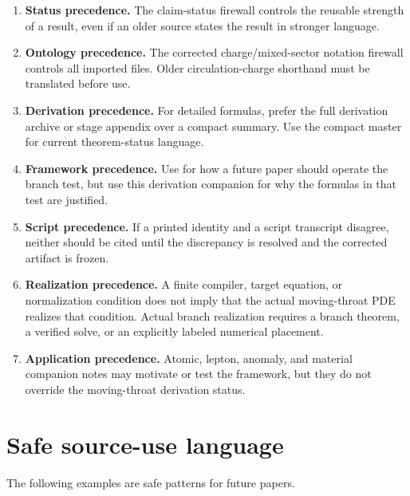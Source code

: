 \begin{enumerate}[leftmargin=2.4em]
\item \textbf{Status precedence.}  The claim-status firewall controls the reusable strength of a result, even if an older source states the result in stronger language.
\item \textbf{Ontology precedence.}  The corrected charge/mixed-sector notation firewall controls all imported files.  Older circulation-charge shorthand must be translated before use.
\item \textbf{Derivation precedence.}  For detailed formulas, prefer the full derivation archive or stage appendix over a compact summary.  Use the compact master for current theorem-status language.
\item \textbf{Framework precedence.}  Use  for how a future paper should operate the branch test, but use this derivation companion for why the formulas in that test are justified.
\item \textbf{Script precedence.}  If a printed identity and a script transcript disagree, neither should be cited until the discrepancy is resolved and the corrected artifact is frozen.
\item \textbf{Realization precedence.}  A finite compiler, target equation, or normalization condition does not imply that the actual moving-throat PDE realizes that condition.  Actual branch realization requires a branch theorem, a verified solve, or an explicitly labeled numerical placement.
\item \textbf{Application precedence.}  Atomic, lepton, anomaly, and material companion notes may motivate or test the framework, but they do not override the moving-throat derivation status.
\end{enumerate}

\section{Safe source-use language}
\label{sec:safe-source-use-language}

The following examples are safe patterns for future papers.

